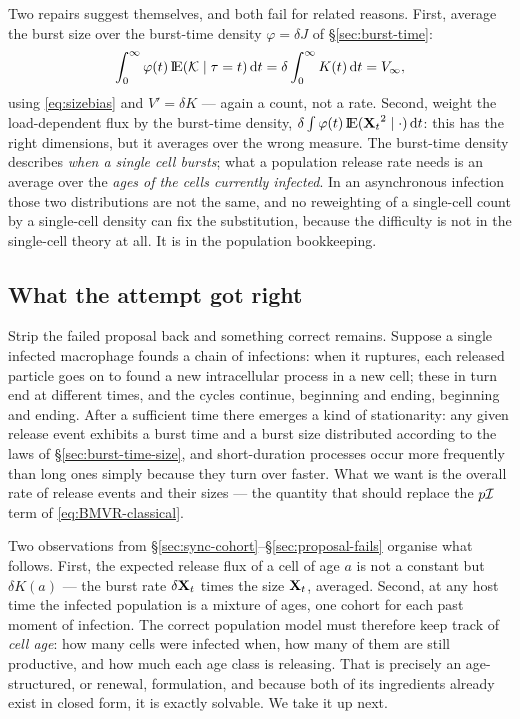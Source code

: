 Two repairs suggest themselves, and both fail for related reasons. First,
average the burst size over the burst-time density $\varphi=\delta J$ of
\S\ref{sec:burst-time}:
\begin{equation}
\int_0^\infty\varphi(t)\,{\rm I}\!{\rm E}(\mathcal{K}\mid\tau=t)\,{\rm d} t
=\delta\int_0^\infty K(t)\,{\rm d} t
=V_\infty,
\end{equation}
using \eqref{eq:sizebias} and $V'=\delta K$ --- again a count, not a rate.
Second, weight the load-dependent flux by the burst-time density,
$\delta\int\varphi(t)\,{\rm I}\!{\rm E}({{\bf X}_t}^2\mid\cdot)\,{\rm d} t$: this has the right
dimensions, but it averages over the wrong measure. The burst-time density
describes \emph{when a single cell bursts}; what a population release rate
needs is an average over the \emph{ages of the cells currently infected}.
In an asynchronous infection those two distributions are not the same, and
no reweighting of a single-cell count by a single-cell density can fix the
substitution, because the difficulty is not in the single-cell theory at
all. It is in the population bookkeeping.

\subsection{What the attempt got right}
\label{sec:attempt-right}

Strip the failed proposal back and something correct remains. Suppose a
single infected macrophage founds a chain of infections: when it ruptures,
each released particle goes on to found a new intracellular process in a new
cell; these in turn end at different times, and the cycles continue,
beginning and ending, beginning and ending. After a sufficient time there
emerges a kind of stationarity: any given release event exhibits a burst
time and a burst size distributed according to the laws of
\S\ref{sec:burst-time-size}, and short-duration processes occur more
frequently than long ones simply because they turn over faster. What we want
is the overall rate of release events and their sizes --- the quantity that
should replace the $p\mathcal{I}$ term of \eqref{eq:BMVR-classical}.

Two observations from \S\ref{sec:sync-cohort}--\S\ref{sec:proposal-fails}
organise what follows. First, the expected release flux of a cell of age
$a$ is not a constant but $\delta K(a)$ --- the burst rate $\delta{{\bf X}_t}$ times
the size ${{\bf X}_t}$, averaged. Second, at any host time the infected population
is a mixture of ages, one cohort for each past moment of infection. The
correct population model must therefore keep track of \emph{cell age}: how
many cells were infected when, how many of them are still productive, and
how much each age class is releasing. That is precisely an age-structured,
or renewal, formulation, and because both of its ingredients already exist
in closed form, it is exactly solvable. We take it up next.
